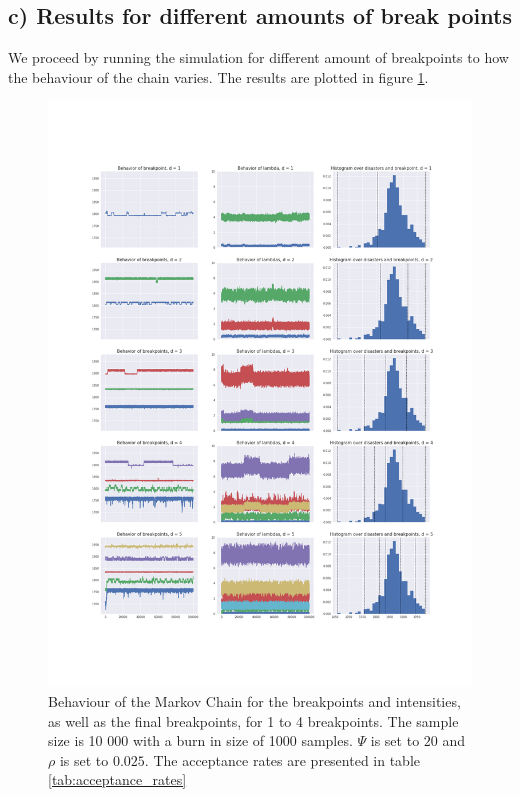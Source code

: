 \documentclass[a4paper]{article}
\begin{document}
\subsection*{c) Results for different amounts of break points}

We proceed by running the simulation for different amount of breakpoints to how the behaviour of the chain varies. The results are plotted in figure \ref{fig:num_breakpoints_results}.

\begin{figure}[H]
    \centering
    \includegraphics[width = 1.0\textwidth]{images/chain_behavior.png} 
    \caption{Behaviour of the Markov Chain for the breakpoints and intensities, as well as the final breakpoints, for 1 to 4 breakpoints. The sample size is 10 000 with a burn in size of 1000 samples. $\Psi$ is set to $20$ and $\rho$ is set to $0.025$. The acceptance rates are presented in table \ref{tab:acceptance_rates}}
    \label{fig:num_breakpoints_results}
\end{figure}
\end{document}
